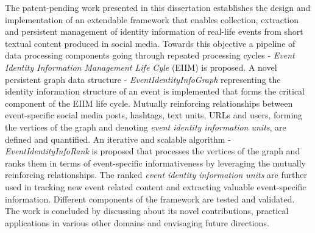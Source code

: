 \documentclass[12pt, oneside]{Thesis} %
\begin{document}
{The patent-pending work presented in this dissertation establishes the design and implementation of an extendable framework that enables collection, extraction and persistent management of identity information of real-life events from short textual content produced in social media. Towards this objective a pipeline of data processing components going through repeated processing cycles - \textit{Event Identity Information Management Life Cyle} (EIIM) is proposed. A novel persistent graph data structure - \textit{EventIdentityInfoGraph} representing the identity information structure of an event is implemented that forms the critical component of the EIIM life cycle. Mutually reinforcing relationships between event-specific social media posts, hashtags, text units, URLs and users, forming the vertices of the graph and denoting \textit{event identity information units}, are defined and quantified. An iterative and scalable algorithm - \textit{EventIdentityInfoRank} is proposed that processes the vertices of the graph and ranks them in terms of event-specific informativeness by leveraging the mutually reinforcing relationships. The ranked \textit{event identity information units} are further used in tracking new event related content and extracting valuable event-specific information. Different components of the framework are tested and validated. The work is concluded by discussing about its novel contributions, practical applications in various other domains and envisaging future directions.}


\clearpage %
\end{document}
